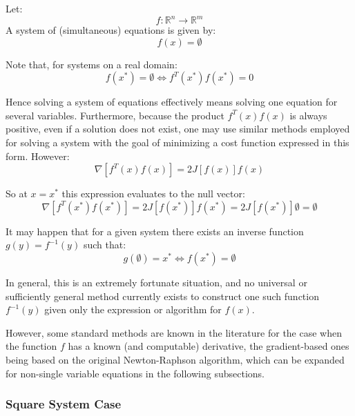 \documentclass[10pt,journal,compsoc]{IEEEtran}
\begin{document}
	Let:
\begin{equation}
	f:\mathbb{R}^n\rightarrow\mathbb{R}^m
\end{equation}
A system of (simultaneous) equations is given by:
\begin{equation}
	f(x)=\emptyset
\end{equation}

	Note that, for systems on a real domain:
\begin{equation}
	f(x^*)=\emptyset \Longleftrightarrow f^T(x^*)f(x^*)=0
\end{equation} 

Hence solving a system of equations effectively means solving one equation for several variables. Furthermore, because the product $f^T(x)f(x)$ is always positive, even if a solution does not exist, one may use similar methods employed for solving a system with the goal of minimizing a cost function expressed in this form.  However:
\begin{equation}
	\nabla\left[ f^T(x)f(x)\right]  = 2J\left[ f(x)\right] f(x)
\end{equation}

So at $x = x^*$ this expression evaluates to the null vector:
\begin{equation}
	\nabla\left[ f^T(x^*)f(x^*)\right]  = 2J\left[ f(x^*)\right] f(x^*) = 2J\left[ f(x^*)\right] \emptyset = \emptyset
\end{equation}

It may happen that for a given system there exists an inverse function $g(y)=f^{-1}(y)$ such that:
\begin{equation}
	g(\emptyset)=x^*\Longleftrightarrow f(x^*)=\emptyset
\end{equation}	

In general, this is an extremely fortunate situation, and no universal or sufficiently general method currently exists to construct one such function $f^{-1}(y)$ given only the expression or algorithm for $f(x)$. 

However, some standard methods are known in the literature for the case when the function $f$ has a known (and computable) derivative, the gradient-based ones being based on the original Newton-Raphson algorithm, which can be expanded for non-single variable equations in the following subsections.

\subsubsection{Square System Case}\label{sec:square}
\end{document}
